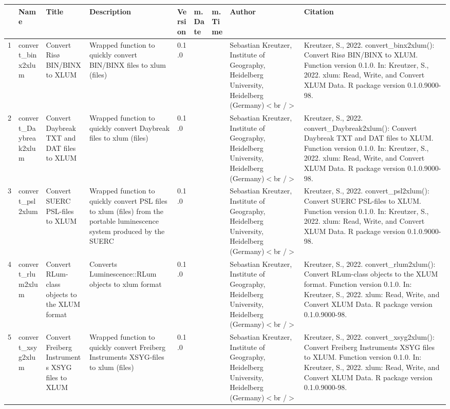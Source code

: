 \begin{table}[ht]
\centering
\begin{tabular}{rllllllll}
  \hline
 & Name & Title & Description & Version & m.Date & m.Time & Author & Citation \\ 
  \hline
1 & convert\_binx2xlum & Convert Risø BIN/BINX to XLUM & Wrapped function to quickly convert BIN/BINX files to  xlum  (files) & 0.1.0
 &  &  & Sebastian Kreutzer, Institute of Geography, Heidelberg University, Heidelberg (Germany)$<$br /$>$ & Kreutzer, S., 2022. convert\_binx2xlum(): Convert Risø BIN/BINX to XLUM. Function version 0.1.0. In: Kreutzer, S., 2022. xlum: Read, Write, and Convert XLUM Data. R package version 0.1.0.9000-98. 
 \\ 
  2 & convert\_Daybreak2xlum & Convert Daybreak TXT and DAT files to XLUM & Wrapped function to quickly convert Daybreak files to  xlum  (files) & 0.1.0
 &  &  & Sebastian Kreutzer, Institute of Geography, Heidelberg University, Heidelberg (Germany)$<$br /$>$ & Kreutzer, S., 2022. convert\_Daybreak2xlum(): Convert Daybreak TXT and DAT files to XLUM. Function version 0.1.0. In: Kreutzer, S., 2022. xlum: Read, Write, and Convert XLUM Data. R package version 0.1.0.9000-98. 
 \\ 
  3 & convert\_psl2xlum & Convert SUERC PSL-files to XLUM & Wrapped function to quickly convert PSL files to  xlum  (files) from the portable luminescence system produced by the SUERC & 0.1.0
 &  &  & Sebastian Kreutzer, Institute of Geography, Heidelberg University, Heidelberg (Germany)$<$br /$>$ & Kreutzer, S., 2022. convert\_psl2xlum(): Convert SUERC PSL-files to XLUM. Function version 0.1.0. In: Kreutzer, S., 2022. xlum: Read, Write, and Convert XLUM Data. R package version 0.1.0.9000-98. 
 \\ 
  4 & convert\_rlum2xlum & Convert RLum-class objects to the XLUM format & Converts  Luminescence::RLum  objects to xlum format & 0.1.0
 &  &  & Sebastian Kreutzer, Institute of Geography, Heidelberg University, Heidelberg (Germany)$<$br /$>$ & Kreutzer, S., 2022. convert\_rlum2xlum(): Convert RLum-class objects to the XLUM format. Function version 0.1.0. In: Kreutzer, S., 2022. xlum: Read, Write, and Convert XLUM Data. R package version 0.1.0.9000-98. 
 \\ 
  5 & convert\_xsyg2xlum & Convert Freiberg Instruments XSYG files to XLUM & Wrapped function to quickly convert Freiberg Instruments XSYG-files to  xlum  (files) & 0.1.0
 &  &  & Sebastian Kreutzer, Institute of Geography, Heidelberg University, Heidelberg (Germany)$<$br /$>$ & Kreutzer, S., 2022. convert\_xsyg2xlum(): Convert Freiberg Instruments XSYG files to XLUM. Function version 0.1.0. In: Kreutzer, S., 2022. xlum: Read, Write, and Convert XLUM Data. R package version 0.1.0.9000-98. 

\end{tabular}
\end{table}
